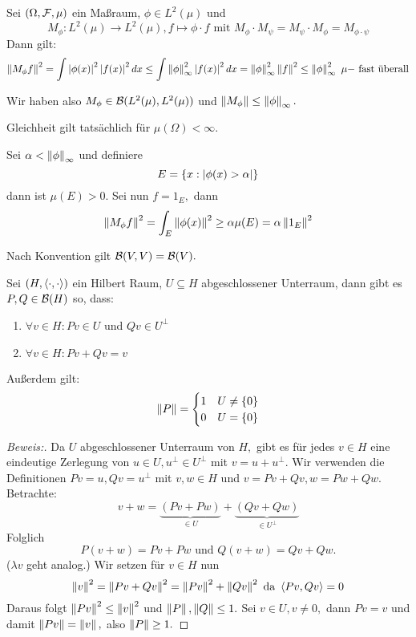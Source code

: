 \begin{ex}[Multiplikationsoperatoren] \label{Mult_op}
    Sei $(\Omega, \mathcal{F}, \mu)$ ein Maßraum, $\phi \in L^2(\mu)$ und \[M_{\phi}: L^2(\mu) \to L^2(\mu), f \mapsto \phi \cdot f \text{ mit } M_{\phi} \cdot M_{\psi} = M_{\psi} \cdot M_{\phi} = M_{\phi \cdot \psi}\] Dann gilt:
    \[\left\lVert M_{\phi}f\right\rVert^2 = \int \left\lvert \phi(x) \right\rvert^2 \left\lvert f(x) \right\rvert^2dx \leq \int \left\lVert\phi\right\rVert_\infty^2 \left\lvert f(x) \right\rvert^2dx = \left\lVert\phi\right\rVert_\infty^2\left\lVert f\right\rVert^2 \leq \left\lVert\phi\right\rVert_\infty^2 \text{ $\mu-$ fast überall}\]
    
    Wir haben also $M_{\phi} \in \mathcal{B}(L^2(\mu), L^2(\mu))$ und $\left\lVert M_{\phi}\right\rVert \leq \left\lVert\phi\right\rVert_\infty.$ 
    
    Gleichheit gilt tatsächlich für $\mu(\Omega) < \infty.$
    
    Sei $\alpha < \left\lVert\phi\right\rVert_\infty$ und definiere
    \[E = \left\{x: \left\lvert \phi(x) > \alpha \right\rvert\right\}\]
    dann ist $\mu(E)>0.$ Sei nun $f = 1_E,$ dann 
    \[\left\lVert M_{\phi}f\right\rVert^2 = \int_E \left\lVert\phi(x)\right\rVert^2 \geq \alpha \mu(E) = \alpha \left\lVert1_E\right\rVert^2\]
\end{ex}

\begin{rem}
    Nach Konvention gilt $\mathcal{B}(V, V) = \mathcal{B}(V).$
\end{rem}

\begin{theorem}
    Sei $(H, \left\langle\cdot, \cdot\right\rangle)$ ein Hilbert Raum, $U \subseteq H$ abgeschlossener Unterraum, dann gibt es $P, Q \in \mathcal{B}(H)$ so, dass:
    
    \begin{enumerate}
        \item $\forall v \in H: Pv \in U$ und $Qv \in U^{\perp}$
        \item $\forall v \in H: Pv + Qv = v$
    \end{enumerate}
    Außerdem gilt: 
    \[\left\lVert P\right\rVert = \begin{cases} 1 & U \not= \left\{0\right\} \\
    0 & U = \left\{0\right\}
    \end{cases}\]
    
    \begin{proof}[Beweis:] Da $U$ abgeschlossener Unterraum von $H,$ gibt es für jedes $v \in H$ eine eindeutige Zerlegung von $u \in U, u^{\perp} \in U^{\perp}$ mit $v = u + u^{\perp}.$ Wir verwenden die Definitionen $Pv = u, Qv = u^{\perp}$ mit $v, w \in H$ und $v = Pv + Qv, w = Pw + Qw.$ Betrachte: \[v + w = \underbrace{(Pv + Pw)}_{\in U} + \underbrace{(Qv + Qw)}_{\in U^{\perp}}\]
    Folglich \[P(v + w) = Pv + Pw \text{ und } Q(v+w) = Qv + Qw.\] ($\lambda v$ geht analog.) Wir setzen für $v \in H$ nun 
    \[\left\lVert v\right\rVert^2 = \left\lVert Pv + Qv\right\rVert^2 = \left\lVert Pv\right\rVert^2 + \left\lVert Qv\right\rVert^2 \text{ da } \left\langle Pv, Qv\right\rangle = 0\] Daraus folgt $\left\lVert Pv\right\rVert^2 \leq \left\lVert v\right\rVert^2$ und $\left\lVert P\right\rVert, \left\lVert Q\right\rVert \leq 1.$ Sei $v \in U, v \not= 0,$ dann $Pv = v$ und damit $\left\lVert Pv\right\rVert = \left\lVert v\right\rVert,$ also $\left\lVert P\right\rVert \geq 1.$
    \end{proof}
\end{theorem}

